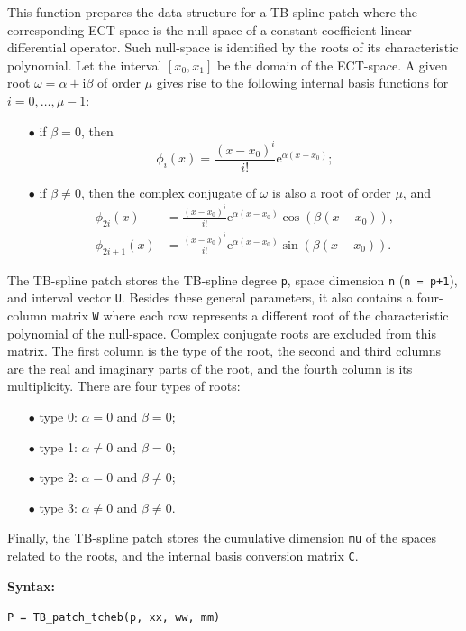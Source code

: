 \documentclass[10pt]{acmtrans2e}
\newcommand{\syntax}[1]{\medskip
\noindent \textbf{Syntax:} \medskip

\texttt{#1}
}
\begin{document}
This function prepares the data-structure for a TB-spline patch where the corresponding ECT-space is the null-space of a constant-coefficient linear differential operator. Such null-space is identified by the roots of its characteristic polynomial. Let the interval $[x_0,x_1]$ be the domain of the ECT-space. A given root $\omega=\alpha+\mathrm{i}\beta$ of order $\mu$ gives rise to the following internal basis functions for $i=0,\ldots,\mu-1$:
\begin{itemize}
  \item[$\bullet$] if $\beta=0$, then
  \begin{equation*}
   \phi_i(x) = \frac{(x-x_0)^i}{i!}\mathrm{e}^{\alpha(x-x_0)};
  \end{equation*}
  \item[$\bullet$] if $\beta\neq0$, then the complex conjugate of $\omega$ is also a root of order $\mu$, and
  \begin{align*}
   \phi_{2i}(x) &= \frac{(x-x_0)^i}{i!}\mathrm{e}^{\alpha(x-x_0)}\cos(\beta(x-x_0)), \\
   \phi_{2i+1}(x) &= \frac{(x-x_0)^i}{i!}\mathrm{e}^{\alpha(x-x_0)}\sin(\beta(x-x_0)).
  \end{align*}
\end{itemize}
The TB-spline patch stores the TB-spline degree \texttt{p}, space dimension \texttt{n} (\texttt{n = p+1}), and interval vector \texttt{U}. Besides these general parameters, it also contains a four-column matrix \texttt{W} where each row represents a different root of the characteristic polynomial of the null-space. Complex conjugate roots are excluded from this matrix. The first column is the type of the root, the second and third columns are the real and imaginary parts of the root, and the fourth column is its multiplicity. There are four types of roots:
\begin{itemize}
  \item[$\bullet$] type 0: $\alpha=0$ and $\beta=0$;
  \item[$\bullet$] type 1: $\alpha\neq0$ and $\beta=0$;
  \item[$\bullet$] type 2: $\alpha=0$ and $\beta\neq0$;
  \item[$\bullet$] type 3: $\alpha\neq0$ and $\beta\neq0$.
\end{itemize}
Finally, the TB-spline patch stores the cumulative dimension \texttt{mu} of the spaces related to the roots, and the internal basis conversion matrix \texttt{C}.

\syntax{P = TB\_patch\_tcheb(p, xx, ww, mm)}
\end{document}
